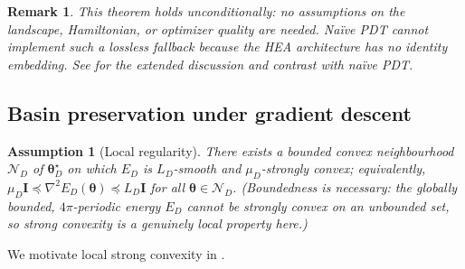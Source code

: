 \documentclass[11pt]{article}
\newcommand{\cN}{\mathcal{N}}
\theoremstyle{plain}
\newtheorem{assumption}[theorem]{Assumption}
\theoremstyle{plain}
\newtheorem{remark}[theorem]{Remark}
\begin{document}
\begin{remark}
This theorem holds unconditionally: no assumptions on the landscape,
Hamiltonian, or optimizer quality are needed.  Na\"ive PDT cannot
implement such a lossless fallback because the HEA architecture has no
identity embedding.  See  for the extended
discussion and contrast with na\"ive PDT.
\end{remark}
\subsection{Basin preservation under gradient descent}
\label{sec:basin}
\begin{assumption}[Local regularity]\label{ass:local_reg}
  There exists a bounded convex neighbourhood $\cN_D$ of
  $\bm\theta_D^\star$ on which $E_D$ is $L_D$-smooth and $\mu_D$-strongly
  convex; equivalently,
  $\mu_D\mathbf{I}\preceq\nabla^2 E_D(\bm\theta)\preceq L_D\mathbf{I}$ for all
  $\bm\theta\in\cN_D$.  (Boundedness is necessary: the globally bounded,
  $4\pi$-periodic energy $E_D$ cannot be strongly convex on an unbounded
  set, so strong convexity is a genuinely local property here.)
\end{assumption}
We motivate local strong convexity in .
\end{document}
